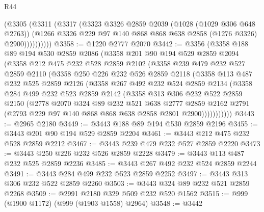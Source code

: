 \begin{lexlean}{R44}
\begin{coremodule}
              (@3305
                (@3311
                  (@3317
                    (@3323
                      @3326
                      @2859
                      @2039
                      (@1028 (@1029 @306 @648 @2763))
                      (@1266 @3326 @229 @97 @140 @868 @868 @638 @2858 (@1276 @3326) @2900))))))))))
@3358 := @1220 @2777 @2070
@3442 := @3356
    (@3358
      @188
      @89
      @194
      @530
      @2859
      @2086
      (@3358
        @201
        @90
        @194
        @529
        @2859
        @2094
        (@3358
          @212
          @475
          @232
          @528
          @2859
          @2102
          (@3358
            @239
            @479
            @232
            @527
            @2859
            @2110
            (@3358
              @250
              @226
              @232
              @526
              @2859
              @2118
              (@3358
                @113
                @487
                @232
                @525
                @2859
                @2126
                (@3358
                  @267
                  @492
                  @232
                  @524
                  @2859
                  @2134
                  (@3358
                    @284
                    @499
                    @232
                    @523
                    @2859
                    @2142
                    (@3358
                      @313
                      @306
                      @232
                      @522
                      @2859
                      @2150
                      (@2778
                        @2070
                        @324
                        @89
                        @232
                        @521
                        @638
                        @2777
                        @2859
                        @2162
                        @2791
                        (@2793 @229 @97 @140 @868 @868 @638 @2858 @2801 @2900)))))))))))
@3443 := @2965 @2180
@3449 := @3443 @188 @89 @194 @530 @2859 @2196
@3455 := @3443 @201 @90 @194 @529 @2859 @2204
@3461 := @3443 @212 @475 @232 @528 @2859 @2212
@3467 := @3443 @239 @479 @232 @527 @2859 @2220
@3473 := @3443 @250 @226 @232 @526 @2859 @2228
@3479 := @3443 @113 @487 @232 @525 @2859 @2236
@3485 := @3443 @267 @492 @232 @524 @2859 @2244
@3491 := @3443 @284 @499 @232 @523 @2859 @2252
@3497 := @3443 @313 @306 @232 @522 @2859 @2260
@3503 := @3443 @324 @89 @232 @521 @2859 @2268
@3509 := @2991 @2180 @329 @509 @232 @520 @1562
@3515 := @999 (@1900 @1172) (@999 (@1903 @1558) @2964)
@3548 := @3442

\end{coremodule}
\end{lexlean}
